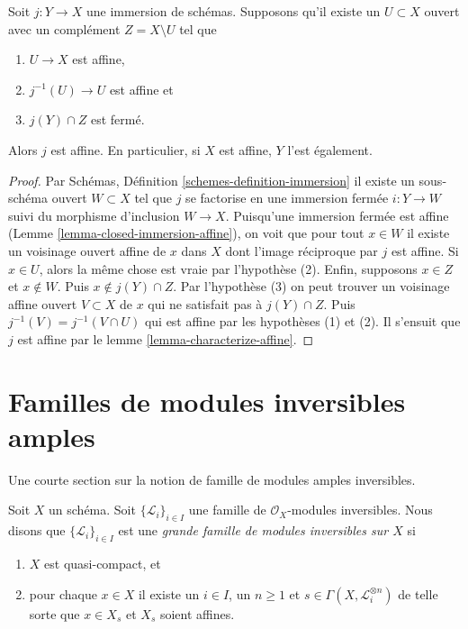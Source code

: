 \begin{lemma}
\label{lemma-get-affine}
Soit $j : Y \to X$ une immersion de schémas. Supposons
qu'il existe un $U \subset X$ ouvert avec un complément
$Z = X \setminus U$ tel que
\begin{enumerate}
\item $U \to X$ est affine,
\item $j^{-1}(U) \to U$ est affine et
\item $j(Y) \cap Z$ est fermé.
\end{enumerate}
Alors $j$ est affine. En particulier, si $X$ est affine, $Y$ l'est également.
\end{lemma}

\begin{proof}
Par Schémas, Définition \ref{schemes-definition-immersion} il existe un sous-schéma ouvert $W \subset X$
tel que $j$ se factorise en une immersion fermée $i : Y \to W$
suivi du morphisme d'inclusion $W \to X$. Puisqu'une
immersion fermée est affine (Lemme
\ref{lemma-closed-immersion-affine}), on voit que pour tout $x \in W$
il existe un voisinage ouvert affine de $x$
dans $X$ dont l'image réciproque par $j$ est affine.
Si $x \in U$, alors la même chose est vraie par l'hypothèse
(2). Enfin, supposons $x \in Z$ et $x \not \in W$. Puis $x \not \in j(Y) \cap Z$.
Par l'hypothèse (3) on peut trouver un voisinage affine
ouvert $V \subset X$ de $x$ qui ne satisfait pas
à $j(Y) \cap Z$. Puis $j^{-1}(V) = j^{-1}(V \cap U)$ qui est affine
par les hypothèses (1) et (2). Il s'ensuit que $j$
est affine par le lemme \ref{lemma-characterize-affine}.
\end{proof}







\section{Familles de modules inversibles amples}
\label{section-families-ample-invertible-modules}

\noindent
Une courte section sur la notion de famille de modules amples inversibles.

\begin{definition}
\label{definition-family-ample-invertible-modules}
\begin{reference}
\cite[II Définition 2.2.4]{SGA6}
\end{reference}
Soit $X$ un schéma. Soit $\{\mathcal{L}_i\}_{i \in I}$ une famille de $\mathcal{O}_X$-modules
inversibles. Nous disons que $\{\mathcal{L}_i\}_{i \in I}$ est
une {\it grande famille
de modules inversibles sur $X$} si
\begin{enumerate}
\item $X$ est quasi-compact, et
\item pour chaque $x \in X$ il existe un $i \in I$, un $n \geq 1$
et $s \in \Gamma(X, \mathcal{L}_i^{\otimes n})$ de telle sorte que $x \in X_s$
et $X_s$ soient affines.
\end{enumerate}
\end{definition}

